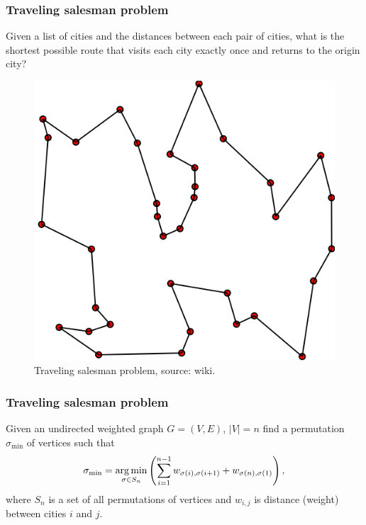 \begin{frame}
	\frametitle{Traveling salesman problem}
	\begin{definition}[TSP]
		Given a list of cities and the distances between each pair of cities, what is the shortest possible route that visits each city exactly once and returns to the origin city?
	\end{definition}
	\begin{figure}
		\centering
		\includegraphics[scale=0.13]{img/travelling_salesman_problem}
		\caption{Traveling salesman problem, source: wiki.}
	\end{figure}
\end{frame}

\begin{frame}
	\frametitle{Traveling salesman problem}
	\begin{definition}
		Given an undirected weighted graph $G = (V, E)$, $|V| = n$ find a permutation $\sigma_{\min}$ of vertices such that
		\begin{equation*}
		\sigma_{\min} = \underset{\sigma \in S_n}{\operatorname*{arg\,min}} \left( \sum_{i=1}^{n-1} w_{\sigma(i), \sigma(i+1)} + w_{\sigma(n), \sigma(1)} \right),
		\end{equation*}
		where $S_n$ is a set of all permutations of vertices and $w_{i,j}$ is distance (weight) between cities $i$ and $j$.
	\end{definition}
\end{frame}
